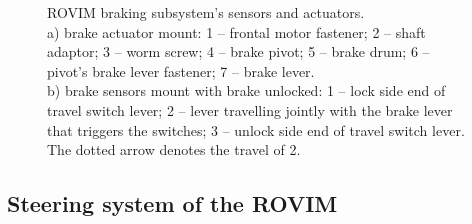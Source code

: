 \documentclass[journal]{IEEEtran}
\begin{document}
\begin{figure}[!t]%
    \centering
        \hfill
        \caption[]{ROVIM braking subsystem's sensors and actuators.\\\hspace{\textwidth}a) brake actuator mount: 1 -- frontal motor fastener; 2 -- shaft adaptor; 3 -- worm screw; 4 -- brake pivot; 5 -- brake drum; 6 -- pivot's brake lever fastener; 7 -- brake lever.\\\hspace{\textwidth}b) brake sensors mount with brake unlocked: 1 -- lock side end of travel switch lever; 2 -- lever travelling jointly with the brake lever that triggers the switches; 3 -- unlock side end of travel switch lever. The dotted arrow denotes the travel of 2.}
\end{figure}

\subsection{Steering system of the ROVIM}
\end{document}
